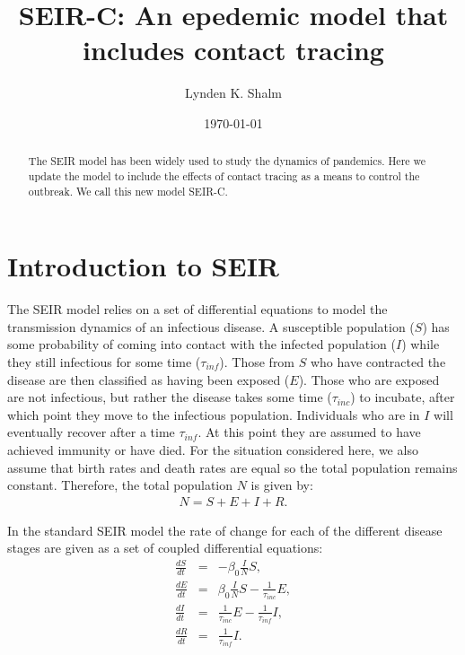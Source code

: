 \documentclass[notitlepage, superscriptaddress]{revtex4-2}
\begin{document}
\title{SEIR-C: An epedemic model that includes contact tracing}

\author{Lynden K. Shalm}



\begin{abstract}
The SEIR model has been widely used to study the dynamics of pandemics. Here we update the model to include the effects of contact tracing as a means to control the outbreak. We call this new model SEIR-C.
\end{abstract}
\date{\today}
\maketitle

\section{Introduction to SEIR}

The SEIR model relies on a set of differential equations to model the transmission dynamics of an infectious disease. A susceptible population ($S$) has some probability of coming into contact with the infected population ($I$) while they still infectious for some time ($\tau_{inf}$). Those from $S$ who have contracted the disease are then classified as having been exposed ($E$). Those who are exposed are not infectious, but rather the disease takes some time ($\tau_{inc}$) to incubate, after which point they move to the infectious population. Individuals who are in $I$ will eventually recover after a time $\tau_{inf}$. At this point they are assumed to have achieved immunity or have died. For the situation considered here, we also assume that birth rates and death rates are equal so the total population remains constant. Therefore, the total population $N$ is given by:
\begin{eqnarray}
\label{E:SEIRPop}
N = S + E + I + R.
\end{eqnarray}

In the standard SEIR model the rate of change for each of the different disease stages are given as a set of coupled differential equations:
\begin{eqnarray}
\label{E:SEIR}
\frac{dS}{dt} &=& - \beta_0 \frac{I}{N}S, \\
\frac{dE}{dt} &=& \beta_0 \frac{I}{N}S - \frac{1}{\tau_{inc}}E, \\ 
\frac{dI}{dt} &=& \frac{1}{\tau_{inc}}E - \frac{1}{\tau_{inf}}I, \\ 
\frac{dR}{dt} &=& \frac{1}{\tau_{inf}}I.
\end{eqnarray}
\end{document}
